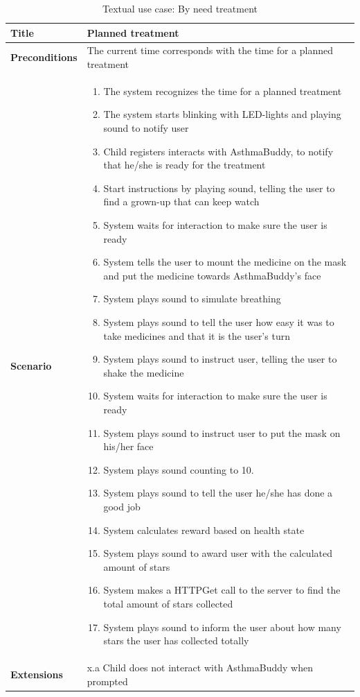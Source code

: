 \begin{table}[H]
\begin{tabular}{|p{4.0cm} | p{9.0cm} |}
\hline
\textbf{Title} & Planned treatment \\
\hline
\textbf{Preconditions} & The current time corresponds with the time for a planned treatment \\
\hline 
\textbf{Scenario} & 
	\begin{enumerate}
	  \item The system recognizes the time for a planned treatment
	  \item The system starts blinking with LED-lights and playing sound to notify user
	  \item Child registers interacts with AsthmaBuddy, to notify that he/she is ready for the treatment
	  \item Start instructions by playing sound, telling the user to find a grown-up that can keep watch
	  \item System waits for interaction to make sure the user is ready
	  \item System tells the user to mount the medicine on the mask and put the medicine towards AsthmaBuddy's face
	  \item System plays sound to simulate breathing
	  \item System plays sound to tell the user how easy it was to take medicines and that it is the user's turn
	  \item System plays sound to instruct user, telling the user to shake the medicine
	  \item System waits for interaction to make sure the user is ready
	  \item System plays sound to instruct user to put the mask on his/her face
	  \item System plays sound counting to 10. 
	  \item System plays sound to tell the user he/she has done a good job
	  \item System calculates reward based on health state
	  \item System plays sound to award user with the calculated amount of stars
	  \item System makes a HTTPGet call to the server to find the total amount of stars collected
	  \item System plays sound to inform the user about how many stars the user has collected totally
	\end{enumerate}
\\
\hline
	\textbf{Extensions} & 
		x.a Child does not interact with AsthmaBuddy when prompted
\\
\hline
\end{tabular}
\caption{Textual use case: By need treatment}
\label{tab:textual-use-case}
\end{table} 


